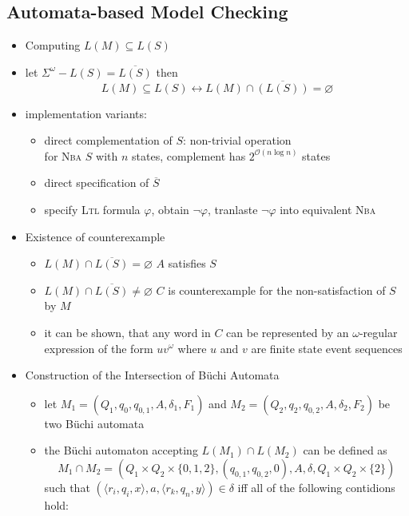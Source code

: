 \documentclass[a4paper, 10pt]{article}
\begin{document}
\subsection*{Automata-based Model Checking}
\begin{itemize}
    \item Computing $L(M)\subseteq L(S)$
    \item let $\Sigma^\omega-L(S)= \overline{L(S)}$ then \[ L(M)\subseteq L(S)\leftrightarrow L(M)\cap \overline{(L(S))} = \varnothing \]
    \item implementation variants:
    \begin{itemize}
        \item direct complementation of $S$: non-trivial operation \\
        for \textsc{Nba} $S$ with $n$ states, complement has $2^{\mathcal{O}(n\log n)}$ states
        \item direct specification of $\overline{S}$
        \item specify \textsc{Ltl} formula $\varphi$, obtain $\neg\varphi$, tranlaste $\neg\varphi$ into equivalent \textsc{Nba}
    \end{itemize}
    \item Existence of counterexample \\
    \begin{itemize}
        \item $L(M)\cap \overline{L(S)}=\varnothing$ \follows $A$ satisfies $S$
        \item $L(M)\cap \overline{L(S)}\not=\varnothing$ \follows $C$ is counterexample for the non-satisfaction of $S$ by $M$
        \item it can be shown, that any word in $C$ can be represented by an $\omega$-regular expression of the form $uv^\omega$ where $u$ and $v$ are finite state event sequences
    \end{itemize}
    \begin{center}
        \scalebox{1}{}
        \end{center}
    \item Construction of the Intersection of Büchi Automata
    \begin{itemize}
        \item let $M_1=(Q_1,q_0,q_{0,1},A,\delta_1,F_1)$ and $M_2=(Q_2,q_2,q_{0,2},A,\delta_2,F_2)$ be two Büchi automata
        \item the Büchi automaton accepting $L(M_1)\cap L(M_2)$ can be defined as \[ M_1\cap M_2 = (Q_1\times Q_2\times\{0,1,2\},(q_{0,1},q_{0,2},0),A,\delta,Q_1\times Q_2\times\{2\}) \] such that $(\langle r_i,q_i,x\rangle,a,\langle r_k,q_n,y\rangle)\in\delta$ iff all of the following contidions hold:

\end{itemize}
\end{itemize}
\end{document}
